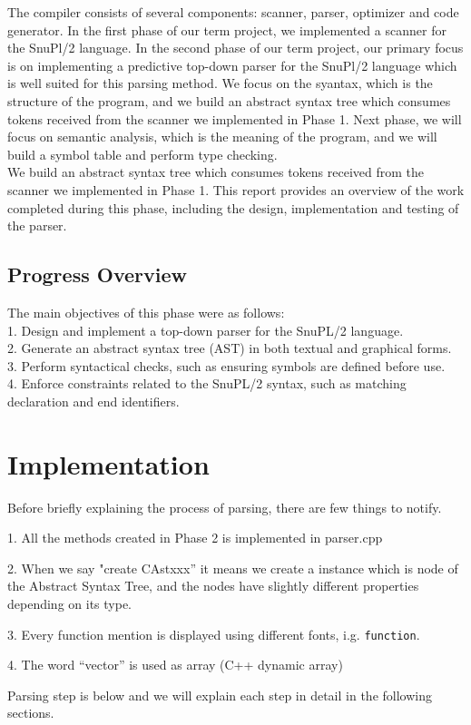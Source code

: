 \documentclass[12pt]{article}
\begin{document}
The compiler consists of several components: scanner, parser, optimizer and code generator\cite{Textbook_Compiler}.
In the first phase of our term project, we implemented a scanner for the SnuPl/2 language.
In the second phase of our term project, our primary focus is on implementing a predictive top-down parser\cite{Egger_Lecture_Note} for the SnuPl/2 language which is well suited for this parsing method.
We focus on the syantax, which is the structure of the program, and we build an abstract syntax tree which consumes tokens received from the scanner we implemented in Phase 1.
Next phase, we will focus on semantic analysis, which is the meaning of the program, and we will build a symbol table and perform type checking.\\

We build an abstract syntax tree which consumes tokens received from the scanner we implemented in Phase 1.
This report provides an overview of the work completed during this phase, including the design, implementation and testing of the parser.


\subsection{Progress Overview}
The main objectives of this phase were as follows:\\
1. Design and implement a top-down parser for the SnuPL/2 language. \\
2. Generate an abstract syntax tree (AST) in both textual and graphical forms. \\
3. Perform syntactical checks, such as ensuring symbols are defined before use. \\
4. Enforce constraints related to the SnuPL/2 syntax, such as matching declaration and end identifiers. \\

\section{Implementation}
\begin{MyIndentedList}
    \item Before briefly explaining the process of parsing, there are few things to notify.
    \begin{MyIndentedList}
        \item 1. All the methods created in Phase 2 is implemented in parser.cpp
        \item 2. When we say "create CAstxxx” it means we create a instance which is node of the Abstract Syntax Tree, and the nodes have slightly different properties depending on its type.
        \item 3. Every function mention is displayed using different fonts, i.g. \texttt{function}.
        \item 4. The word “vector” is used as array (C++ dynamic array)
    \end{MyIndentedList}
\end{MyIndentedList}
Parsing step is below and we will explain each step in detail in the following sections.
\end{document}
